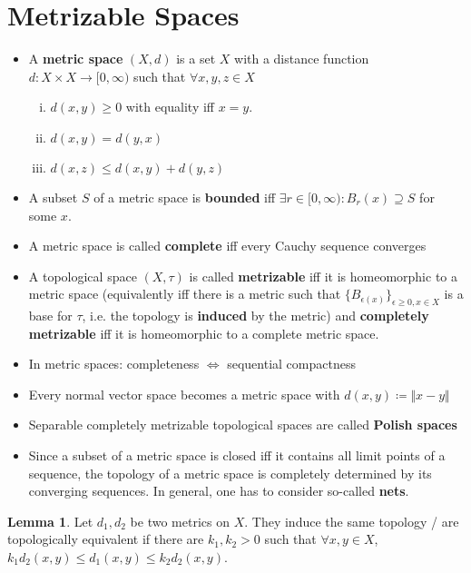 \documentclass[10pt,a4paper]{article}
\theoremstyle{definition}
\theoremstyle{cor}
\theoremstyle{theorem}
\theoremstyle{lemma}
\newtheorem{lemma}{Lemma}
\theoremstyle{example}
\theoremstyle{remark}
\begin{document}
\section{Metrizable Spaces}
\begin{itemize}
\item A \textbf{metric space} $(X, d)$ is a set $X$ with a distance function $d : X\times X \rightarrow [0, \infty)$ such that $\forall x, y, z \in X$
\begin{enumerate}[(i)]
\item $d(x, y) \geq 0$ with equality iff $x=y$.
\item $d(x, y) = d(y, x)$
\item $d(x, z) \leq d(x, y) + d(y, z)$ 
\end{enumerate} 
\item A subset $S$ of a metric space is \textbf{bounded} iff $\exists r\in[0, \infty) : B_{r}(x) \supseteq S$ for some $x$.
\item A metric space is called \textbf{complete} iff every Cauchy sequence converges
\item A topological space $(X, \tau)$ is called \textbf{metrizable} iff it is homeomorphic to a metric space (equivalently iff there is a metric such that $\{ B_{\epsilon(x)} \}_{\epsilon\geq 0, x \in X}$ is a base for $\tau$, i.e. the topology is \textbf{induced} by the metric) and \textbf{completely metrizable} iff it is homeomorphic to a complete metric space.
\end{itemize}

\begin{itemize}
\item In metric spaces: completeness $\Leftrightarrow$ sequential compactness
\item Every normal vector space becomes a metric space with $d(x, y) \coloneqq \Vert x - y\Vert$
\item Separable completely metrizable topological spaces are called \textbf{Polish spaces}
\item Since a subset of a metric space is closed iff it contains all limit points of a sequence, the topology of a metric space is completely determined by its converging sequences. In general, one has to consider so-called \textbf{nets}.
\end{itemize}

\begin{lemma}
Let $d_1, d_2$ be two metrics on $X$. They induce the same topology / are topologically equivalent if there are $k_1, k_2 > 0$ such that $\forall x, y \in X$, $k_1d_2(x, y) \leq d_1(x, y) \leq k_2 d_2 (x, y)$.
\end{lemma}
\end{document}
